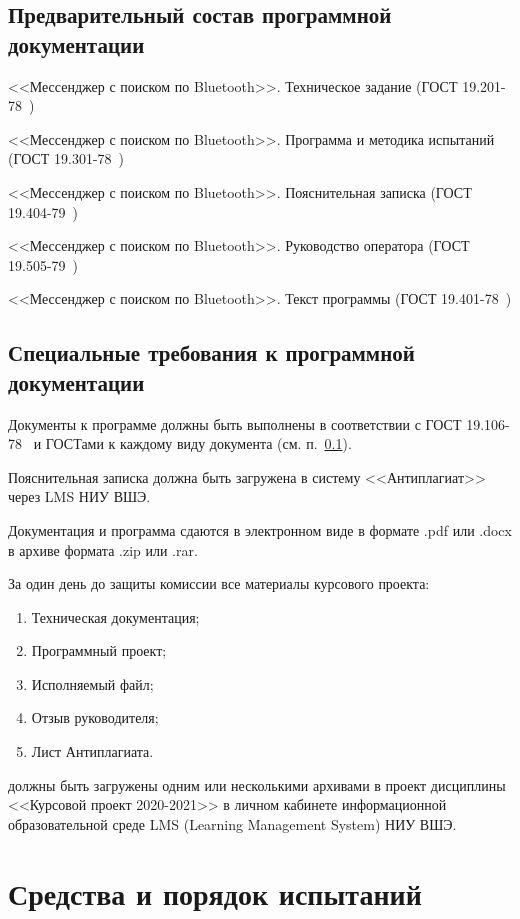 \documentclass[testmethods]{espd}
\begin{document}
\subsection{Предварительный состав программной документации}\label{subsection:documentation}
<<Мессенджер с поиском по Bluetooth>>. Техническое задание (ГОСТ 19.201-78~\cite{espd201})

<<Мессенджер с поиском по Bluetooth>>. Программа и методика испытаний (ГОСТ 19.301-78~\cite{espd301})

<<Мессенджер с поиском по Bluetooth>>. Пояснительная записка (ГОСТ 19.404-79~\cite{espd404})

<<Мессенджер с поиском по Bluetooth>>. Руководство оператора (ГОСТ 19.505-79~\cite{espd505})

<<Мессенджер с поиском по Bluetooth>>. Текст программы (ГОСТ 19.401-78~\cite{espd401})

\subsection{Специальные требования к программной документации}\label{subsection:docspec}
Документы к программе должны быть выполнены в соответствии с ГОСТ 19.106-78~\cite{espd106} и ГОСТами к каждому виду документа (см. п.~\ref{subsection:documentation}).

Пояснительная записка должна быть загружена в систему <<Антиплагиат>> через LMS НИУ ВШЭ.

Документация и программа сдаются в электронном виде в формате .pdf или .docx в архиве формата .zip или .rar.

За один день до защиты комиссии все материалы курсового проекта:
\begin{enumerate}
\item Техническая документация;
\item Программный проект;
\item Исполняемый файл;
\item Отзыв руководителя;
\item Лист Антиплагиата.
\end{enumerate}
должны быть загружены одним или несколькими архивами в проект дисциплины <<Курсовой проект 2020-2021>> в личном кабинете информационной образовательной среде LMS (Learning Management System) НИУ ВШЭ.

\section{Средства и порядок испытаний}
\end{document}
